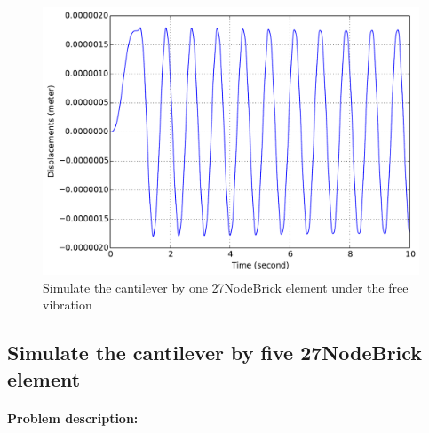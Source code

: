 \begin{figure}[!htb]
  \centering
  \includegraphics[width=12cm]{./Figure-files/_Chapter_Appendix_Illustrative_Examples/brick-1element-freeVibration.pdf}
  \caption{Simulate the cantilever by one 27NodeBrick element under the free vibration}
  \label{fig_brick1-freevib}
\end{figure}













\newpage
\subsection{Simulate the cantilever by five 27NodeBrick element} 
\paragraph{Problem description:} ~

